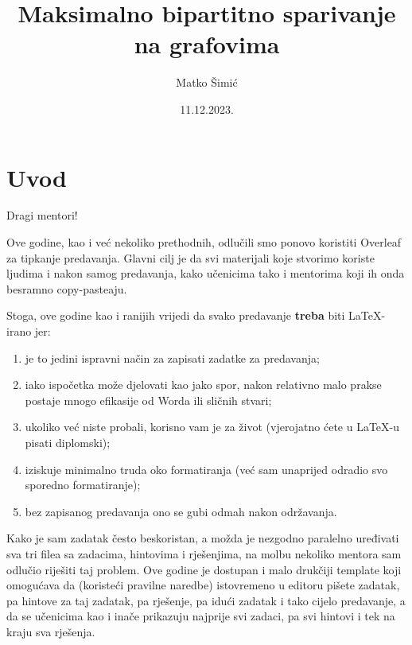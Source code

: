 
\usepackage{biblatex}


\title{Maksimalno bipartitno sparivanje na grafovima}
\author{Matko Šimić}
\date{11.12.2023.}



    \maketitle
    
    \section{Uvod}
    
    Dragi mentori!\medskip
    
    Ove godine, kao i već nekoliko prethodnih, odlučili smo ponovo koristiti Overleaf za tipkanje predavanja. Glavni cilj je da svi materijali koje stvorimo koriste ljudima i nakon samog predavanja, kako učenicima tako i mentorima koji ih onda besramno copy-pasteaju.\medskip
    
    Stoga, ove godine kao i ranijih vrijedi da svako predavanje \textbf{treba} biti \LaTeX-irano jer:
        \begin{enumerate}
            \item je to jedini ispravni način za zapisati zadatke za predavanja;
            \item iako ispočetka može djelovati kao jako spor, nakon relativno malo prakse postaje mnogo efikasije od Worda ili sličnih stvari;
            \item ukoliko već niste probali, korisno vam je za život (vjerojatno ćete u \LaTeX-u pisati diplomski);
            \item iziskuje minimalno truda oko formatiranja (već sam unaprijed odradio svo sporedno formatiranje);
            \item bez zapisanog predavanja ono se gubi odmah nakon održavanja.
        \end{enumerate}

    Kako je sam zadatak često beskoristan, a možda je nezgodno paralelno uređivati sva tri filea sa zadacima, hintovima i rješenjima, na molbu nekoliko mentora sam odlučio riješiti taj problem. Ove godine je dostupan i malo drukčiji template koji omogućava da (koristeći pravilne naredbe) istovremeno u editoru pišete zadatak, pa hintove za taj zadatak, pa rješenje, pa idući zadatak i tako cijelo predavanje, a da se učenicima kao i inače prikazuju najprije svi zadaci, pa svi hintovi i tek na kraju sva rješenja. 

